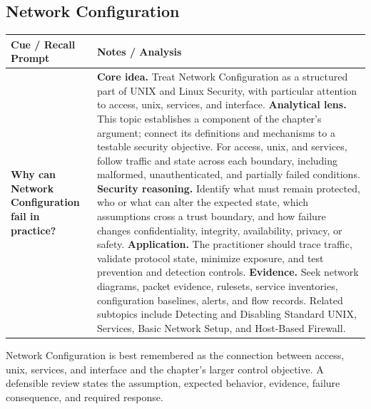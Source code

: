 \documentclass[11pt]{article}
\newcommand{\CornellHeader}{%
\rowcolor{Navy}\color{white}\bfseries Cue / Recall Prompt & \color{white}\bfseries Notes / Analysis\\\hline}
\newcommand{\CornellRow}[2]{%
\cellcolor{CueGray}\RaggedRight\textbf{#1} & \RaggedRight #2\\\hline}
\begin{document}
\subsection*{Network Configuration}
\begin{longtable}{>{\RaggedRight\arraybackslash}p{}|>{\RaggedRight\arraybackslash}p{}}
\CornellHeader
\CornellRow{Why can Network Configuration fail in practice?}{\textbf{Core idea.} Treat Network Configuration as a structured part of UNIX and Linux Security, with particular attention to access, unix, services, and interface. \textbf{Analytical lens.} This topic establishes a component of the chapter's argument; connect its definitions and mechanisms to a testable security objective. For access, unix, and services, follow traffic and state across each boundary, including malformed, unauthenticated, and partially failed conditions. \textbf{Security reasoning.} Identify what must remain protected, who or what can alter the expected state, which assumptions cross a trust boundary, and how failure changes confidentiality, integrity, availability, privacy, or safety. \textbf{Application.} The practitioner should trace traffic, validate protocol state, minimize exposure, and test prevention and detection controls. \textbf{Evidence.} Seek network diagrams, packet evidence, rulesets, service inventories, configuration baselines, alerts, and flow records. Related subtopics include Detecting and Disabling Standard UNIX, Services, Basic Network Setup, and Host-Based Firewall.}
\end{longtable}
\begin{topicsummary}
Network Configuration is best remembered as the connection between access, unix, services, and interface and the chapter's larger control objective. A defensible review states the assumption, expected behavior, evidence, failure consequence, and required response.
\end{topicsummary}
\end{document}
